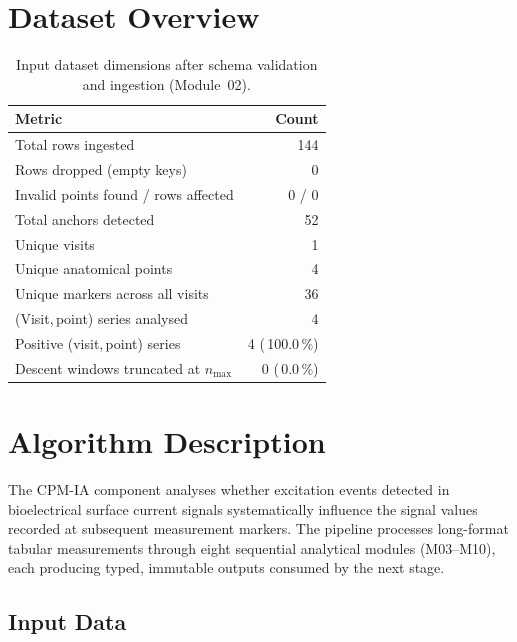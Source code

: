 \documentclass[a4paper,11pt]{article}
\begin{document}
\section{Dataset Overview}

\begin{table}[h!]
\centering
\small
\caption{Input dataset dimensions after schema validation and ingestion (Module~02).}
\begin{tabular}{lr}
\toprule
\textbf{Metric} & \textbf{Count} \\
\midrule
Total rows ingested                        & 144 \\
Rows dropped (empty keys)                  & 0 \\
Invalid points found / rows affected       & 0 / 0 \\
Total anchors detected                     & 52 \\
Unique visits                          & 1 \\
Unique anatomical points               & 4 \\
Unique markers across all visits       & 36 \\
(Visit,\,point) series analysed        & 4 \\
Positive (visit,\,point) series        & 4 (\,100.0\,\%) \\
Descent windows truncated at $n_{\max}$ & 0 (\,0.0\,\%) \\
\bottomrule
\end{tabular}
\end{table}

\section{Algorithm Description}

The CPM-IA component analyses whether excitation events detected in bioelectrical surface
current signals systematically influence the signal values recorded at subsequent measurement
markers. The pipeline processes long-format tabular measurements through eight sequential
analytical modules (M03--M10), each producing typed, immutable outputs consumed by the next
stage.

\subsection{Input Data}
\end{document}
